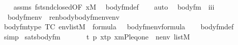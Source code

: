 \begin{isabellebody}
%
\isadelimproof
\ \ %
\endisadelimproof
%
\isatagproof
{}\isamarkupfalse%
\ assms\ fst{\isacharunderscore}{\kern0pt}snd{\isacharunderscore}{\kern0pt}closed{\isacharbrackleft}{\kern0pt}OF\ {\isacartoucheopen}x{\isasymin}M{\isacartoucheclose}{\isacharbrackright}{\kern0pt}\ \isamarkupfalse%
\ body{\isacharunderscore}{\kern0pt}fm{\isacharprime}{\kern0pt}{\isacharunderscore}{\kern0pt}def\isanewline
\ \ \isamarkupfalse%
\ {\isacharparenleft}{\kern0pt}auto{\isacharparenright}{\kern0pt}%
\endisatagproof
{\isafoldproof}%
%
\isadelimproof
\isanewline
%
\endisadelimproof
\isanewline
{}\isamarkupfalse%
\isanewline
\ \ body{\isacharunderscore}{\kern0pt}fm\ {\isacharcolon}{\kern0pt}{\isacharcolon}{\kern0pt}\ {\isachardoublequoteopen}{\isacharbrackleft}{\kern0pt}i{\isacharcomma}{\kern0pt}i{\isacharbrackright}{\kern0pt}{\isasymRightarrow}i{\isachardoublequoteclose}\ \isanewline
\ \ {\isachardoublequoteopen}body{\isacharunderscore}{\kern0pt}fm{\isacharparenleft}{\kern0pt}{\isasymphi}{\isacharcomma}{\kern0pt}env{\isacharparenright}{\kern0pt}\ {\isasymequiv}\ renbody{\isacharparenleft}{\kern0pt}body{\isacharunderscore}{\kern0pt}fm{\isacharprime}{\kern0pt}{\isacharparenleft}{\kern0pt}{\isasymphi}{\isacharcomma}{\kern0pt}env{\isacharparenright}{\kern0pt}{\isacharcomma}{\kern0pt}env{\isacharparenright}{\kern0pt}{\isachardoublequoteclose}\isanewline
\isanewline
{}\isamarkupfalse%
\ body{\isacharunderscore}{\kern0pt}fm{\isacharunderscore}{\kern0pt}type\ {\isacharbrackleft}{\kern0pt}TC{\isacharbrackright}{\kern0pt}{\isacharcolon}{\kern0pt}\ {\isachardoublequoteopen}env{\isasymin}list{\isacharparenleft}{\kern0pt}M{\isacharparenright}{\kern0pt}\ {\isasymLongrightarrow}\ {\isasymphi}{\isasymin}formula\ {\isasymLongrightarrow}\ \ body{\isacharunderscore}{\kern0pt}fm{\isacharparenleft}{\kern0pt}{\isasymphi}{\isacharcomma}{\kern0pt}env{\isacharparenright}{\kern0pt}{\isasymin}formula{\isachardoublequoteclose}\isanewline
%
\isadelimproof
\ \ %
\endisadelimproof
%
\isatagproof
{}\isamarkupfalse%
\ body{\isacharunderscore}{\kern0pt}fm{\isacharunderscore}{\kern0pt}def\ \isamarkupfalse%
\ simp%
\endisatagproof
{\isafoldproof}%
%
\isadelimproof
\isanewline
%
\endisadelimproof
\isanewline
{}\isamarkupfalse%
\ sats{\isacharunderscore}{\kern0pt}body{\isacharunderscore}{\kern0pt}fm{\isacharcolon}{\kern0pt}\isanewline
\ \ \isanewline
\ \ \ \ {\isachardoublequoteopen}{\isasymexists}t\ p{\isachardot}{\kern0pt}\ x{\isacharequal}{\kern0pt}{\isasymlangle}t{\isacharcomma}{\kern0pt}p{\isasymrangle}{\isachardoublequoteclose}\ {\isachardoublequoteopen}{\isacharbrackleft}{\kern0pt}{\isasymalpha}{\isacharcomma}{\kern0pt}x{\isacharcomma}{\kern0pt}m{\isacharcomma}{\kern0pt}P{\isacharcomma}{\kern0pt}leq{\isacharcomma}{\kern0pt}one{\isacharbrackright}{\kern0pt}\ {\isacharat}{\kern0pt}\ nenv\ {\isasymin}list{\isacharparenleft}{\kern0pt}M{\isacharparenright}{\kern0pt}{\isachardoublequoteclose}\isanewline

\end{isabellebody}
